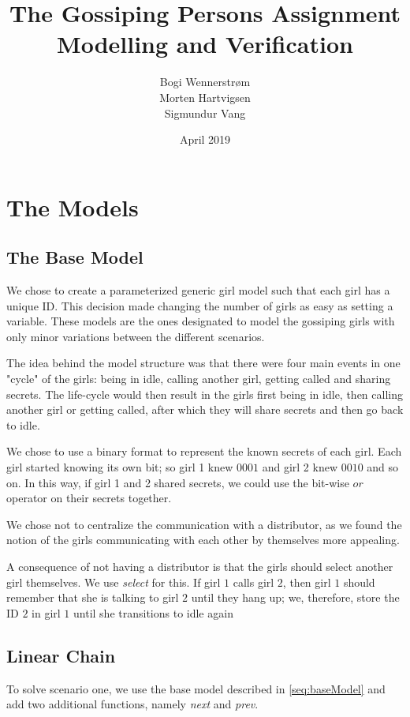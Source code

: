 \documentclass{article}
\title{
    The Gossiping Persons Assignment\\
    \large Modelling and Verification
}
\author{
    Bogi Wennerstrøm \\ 
    Morten Hartvigsen \\
    Sigmundur Vang
}
\date{April 2019}
\begin{document}
\maketitle
\setlength{\parskip}{6pt}

\section*{The Models}
\subsection*{The Base Model}\label{seq:baseModel}
We chose to create a parameterized generic girl model such that each girl has a unique ID. This decision made changing the number of girls as easy as setting a variable. These models are the ones designated to model the gossiping girls with only minor variations between the different scenarios.

The idea behind the model structure was that there were four main events in one "cycle" of the girls: being in idle, calling another girl, getting called and sharing secrets. The life-cycle would then result in the girls first being in idle, then calling another girl or getting called, after which they will share secrets and then go back to idle.

We chose to use a binary format to represent the known secrets of each girl. Each girl started knowing its own bit; so girl 1 knew $0001$ and girl 2 knew $0010$ and so on. In this way, if girl 1 and 2 shared secrets, we could use the bit-wise $or$ operator on their secrets together.

We chose not to centralize the communication with a distributor, as we found the notion of the girls communicating with each other by themselves more appealing.

A consequence of not having a distributor is that the girls should select another girl themselves. We use \textit{select} for this. If girl $1$ calls girl $2$, then girl $1$ should remember that she is talking to girl $2$ until they hang up; we, therefore, store the ID $2$ in girl $1$ until she transitions to idle again

\subsection*{Linear Chain}

To solve scenario one, we use the base model described in \autoref{seq:baseModel} and add two additional functions, namely \textit{next} and \textit{prev}.
\end{document}
